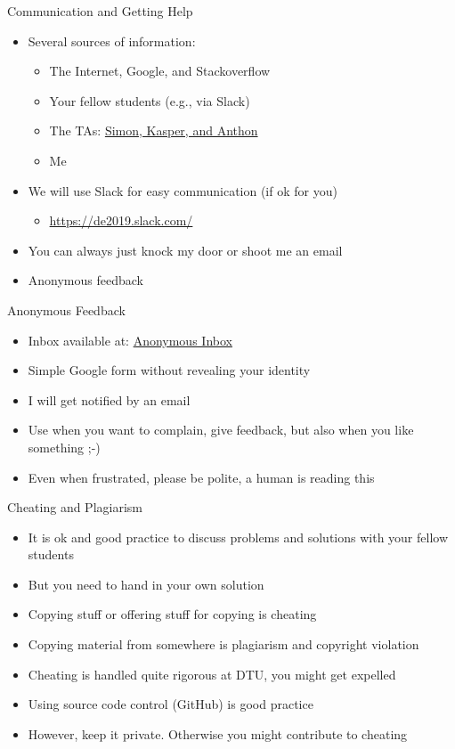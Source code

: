 \documentclass[xcolor=pdflatex,dvipsnames,table]{beamer}
\begin{document}
\begin{frame}[fragile]{Communication and Getting Help}
\begin{itemize}
\item Several sources of information:
\begin{itemize}
\item The Internet, Google, and Stackoverflow
\item Your fellow students (e.g., via Slack)
\item The TAs: \href{https://cn.inside.dtu.dk/cnnet/element/612883/participants}{Simon, Kasper, and Anthon}
\item Me
\end{itemize}
\item We will use Slack for easy communication (if ok for you)
\begin{itemize}
\item \url{https://de2019.slack.com/}
\end{itemize}
\item You can always just knock my door or shoot me an email
\item Anonymous feedback
\end{itemize}
\end{frame}

\begin{frame}[fragile]{Anonymous Feedback}
\begin{itemize}
\item Inbox available at: 
\href{https://docs.google.com/forms/d/e/1FAIpQLSclKyEM_foF7U0TF-CoIZhla5EFEcE8-EGD7Jvle6TBB90WZw/viewform?vc=0&c=0&w=1&usp=mail_form_link}{Anonymous Inbox}
\item Simple Google form without revealing your identity
\item I will get notified by an email
\item Use when you want to complain, give feedback, but also when you like something ;-)
\item Even when frustrated, please be polite, a human is reading this
\end{itemize}
\end{frame}

\begin{frame}[fragile]{Cheating and Plagiarism}
\begin{itemize}
\item It is ok and good practice to discuss problems and solutions with your fellow students
\item But you need to hand in your own solution
\item Copying stuff or offering stuff for copying is cheating
\item Copying material from somewhere is plagiarism and copyright violation
\item Cheating is handled quite rigorous at DTU, you might get expelled
\item Using source code control (GitHub) is good practice
\item However, keep it private. Otherwise you might contribute to cheating
\end{itemize}
\end{frame}
\end{document}
